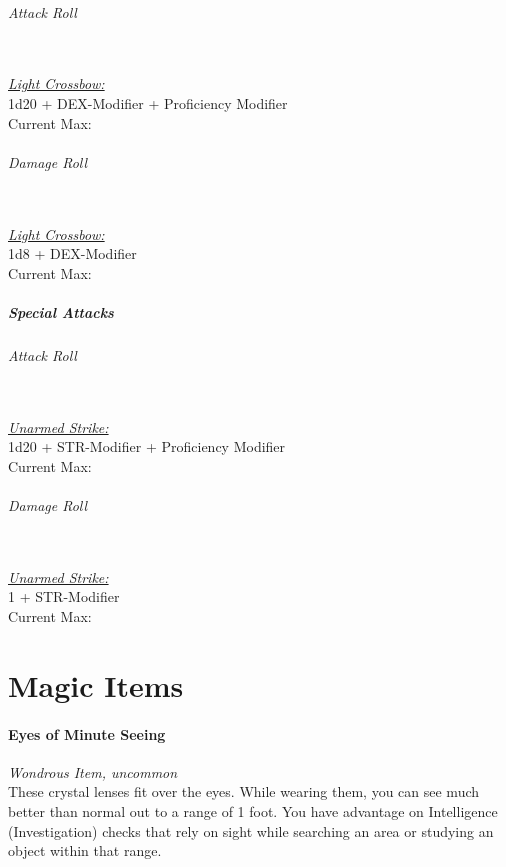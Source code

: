 \documentclass[letterpaper,openany,oneside,twocolumn]{book}
\newcommand{\PATH}{../../../}
\begin{document}
\paragraph*{Attack Roll}\hfill\\
\underline{\textit{Light Crossbow:}}\\
1d20 + DEX-Modifier + Proficiency Modifier\\
\indent Current Max: 
\paragraph*{Damage Roll}\hfill\\
\underline{\textit{Light Crossbow:}}\\
1d8 + DEX-Modifier\\
\indent Current Max: 
\subsubsection*{Special Attacks}
\paragraph*{Attack Roll}\hfill\\
\underline{\textit{Unarmed Strike:}}\\
1d20 + STR-Modifier + Proficiency Modifier\\
\indent Current Max: 
\paragraph*{Damage Roll}\hfill\\
\underline{\textit{Unarmed Strike:}}\\
1 + STR-Modifier\\
\indent Current Max: 

\part*{Magic Items}


\newpage
\subsection*{Eyes of Minute Seeing}
\textit{Wondrous Item, uncommon}\\
These crystal lenses fit over the eyes. While wearing them, you can see much better than normal out to a range of 1 foot. You have advantage on Intelligence (Investigation) checks that rely on sight while searching an area or studying an object within that range.
\end{document}
